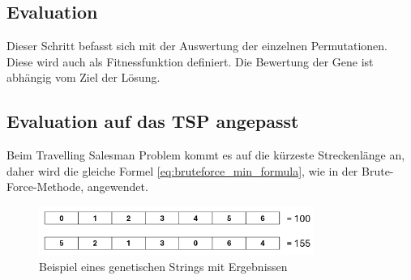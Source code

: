 %
%
%
%
\subsection{Evaluation
\label{buch:paper:varalg:subsection:evaluation}}
Dieser Schritt befasst sich mit der Auswertung der einzelnen 
Permutationen. Diese wird auch als Fitnessfunktion definiert.
Die Bewertung der Gene ist abhängig vom Ziel der Lösung.

\subsection{Evaluation auf das TSP angepasst
\label{buch:paper:varalg:subsection:evaluation_tsp}}
Beim Travelling Salesman Problem kommt es auf die kürzeste Streckenlänge an, 
daher wird die gleiche Formel \eqref{eq:bruteforce_min_formula}, wie in der 
Brute-Force-Methode, angewendet.
\begin{figure}
	\centering
	\includegraphics[width=0.8\textwidth]{
        papers/varalg/images/teil3/03GeneticStringCitiesResults.png
        }
	\caption{Beispiel eines genetischen Strings mit Ergebnissen}
	\label{fig:cities_genetic_string_results}
\end{figure}

